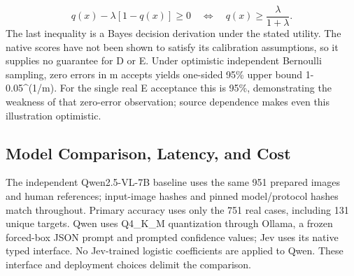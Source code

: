 \documentclass[10pt]{article}
\begin{document}
\begin{equation}
q(x)-\lambda[1-q(x)]\geq0\quad\Longleftrightarrow\quad q(x)\geq\frac{\lambda}{1+\lambda}.
\label{eq:6}
\end{equation}
The last inequality is a Bayes decision derivation under the stated utility. The native scores have not been shown to satisfy its calibration assumptions, so it supplies no guarantee for D or E. Under optimistic independent Bernoulli sampling, zero errors in m accepts yields one-sided 95\% upper bound 1-0.05\textasciicircum{}(1/m). For the single real E acceptance this is 95\%, demonstrating the weakness of that zero-error observation; source dependence makes even this illustration optimistic.

\subsection{Model Comparison, Latency, and Cost}
The independent Qwen2.5-VL-7B baseline uses the same 951 prepared images and human references; input-image hashes and pinned model/protocol hashes match throughout. Primary accuracy uses only the 751 real cases, including 131 unique targets. Qwen uses Q4\_K\_M quantization through Ollama, a frozen forced-box JSON prompt and prompted confidence values; Jev uses its native typed interface. No Jev-trained logistic coefficients are applied to Qwen. These interface and deployment choices delimit the comparison.
\end{document}
